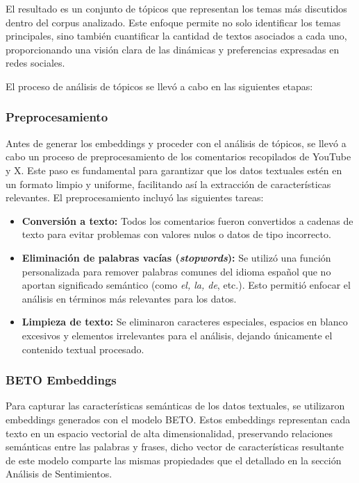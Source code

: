 \documentclass[10pt, a4paper]{article}
\begin{document}
	El resultado es un conjunto de tópicos que representan los temas más discutidos dentro del corpus analizado. Este enfoque permite no solo identificar los temas principales, sino también cuantificar la cantidad de textos asociados a cada uno, proporcionando una visión clara de las dinámicas y preferencias expresadas en redes sociales.
	
	El proceso de análisis de tópicos se llevó a cabo en las siguientes etapas:
	
	
	\subsubsection{Preprocesamiento}
	Antes de generar los embeddings y proceder con el análisis de tópicos, se llevó a cabo un proceso de preprocesamiento de los comentarios recopilados de YouTube y X. Este paso es fundamental para garantizar que los datos textuales estén en un formato limpio y uniforme, facilitando así la extracción de características relevantes. El preprocesamiento incluyó las siguientes tareas:
	
	\begin{itemize}
		\item \textbf{Conversión a texto:} Todos los comentarios fueron convertidos a cadenas de texto para evitar problemas con valores nulos o datos de tipo incorrecto.
		\item \textbf{Eliminación de palabras vacías (\textit{stopwords}):} Se utilizó una función personalizada para remover palabras comunes del idioma español que no aportan significado semántico (como \textit{el, la, de}, etc.). Esto permitió enfocar el análisis en términos más relevantes para los datos.
		\item \textbf{Limpieza de texto:} Se eliminaron caracteres especiales, espacios en blanco excesivos y elementos irrelevantes para el análisis, dejando únicamente el contenido textual procesado.
	\end{itemize}
	
	
	\subsubsection{BETO Embeddings}
	Para capturar las características semánticas de los datos textuales, se utilizaron embeddings generados con el modelo BETO. Estos embeddings representan cada texto en un espacio vectorial de alta dimensionalidad, preservando relaciones semánticas entre las palabras y frases, dicho vector de características resultante de este modelo comparte las mismas propiedades que el detallado en la sección Análisis de Sentimientos.
\end{document}
